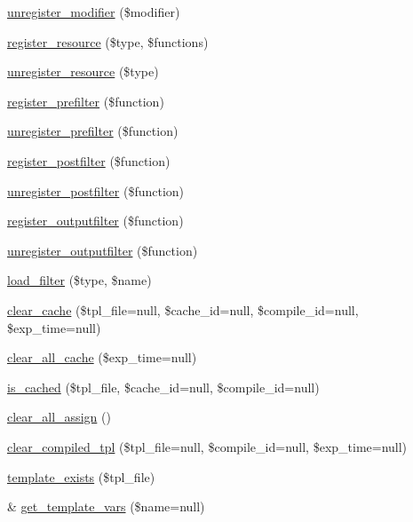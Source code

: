\begin{DoxyCompactItemize}
\hyperlink{class_smarty_aa0efdcad7fc5a36846e5e8bd8a455dd9}{unregister\-\_\-modifier} (\$modifier)
\item 
\hyperlink{class_smarty_a27683a72840c9401cde24eec57d493df}{register\-\_\-resource} (\$type, \$functions)
\item 
\hyperlink{class_smarty_a509d4408ce20f6def85118984b81a32e}{unregister\-\_\-resource} (\$type)
\item 
\hyperlink{class_smarty_afdd4dead058273890d629d207f236239}{register\-\_\-prefilter} (\$function)
\item 
\hyperlink{class_smarty_a8208fd226842f48de08ce37305295d64}{unregister\-\_\-prefilter} (\$function)
\item 
\hyperlink{class_smarty_a1eb31d2b852e5862a3d04284614d145b}{register\-\_\-postfilter} (\$function)
\item 
\hyperlink{class_smarty_a36d917f9b975efc48682198c705eb244}{unregister\-\_\-postfilter} (\$function)
\item 
\hyperlink{class_smarty_a54426aae9228293c47e05f4ceaacd516}{register\-\_\-outputfilter} (\$function)
\item 
\hyperlink{class_smarty_a8d7427d8dc5f3d71aeb3385b9aad3700}{unregister\-\_\-outputfilter} (\$function)
\item 
\hyperlink{class_smarty_ad642cca94486c492c56071fb32a3421c}{load\-\_\-filter} (\$type, \$name)
\item 
\hyperlink{class_smarty_a6b5412f074996dea92d89b32a13880d8}{clear\-\_\-cache} (\$tpl\-\_\-file=null, \$cache\-\_\-id=null, \$compile\-\_\-id=null, \$exp\-\_\-time=null)
\item 
\hyperlink{class_smarty_aaf1eab6e680746ae852abfc3814382fb}{clear\-\_\-all\-\_\-cache} (\$exp\-\_\-time=null)
\item 
\hyperlink{class_smarty_a70d12433755791c1383f394b6a41271d}{is\-\_\-cached} (\$tpl\-\_\-file, \$cache\-\_\-id=null, \$compile\-\_\-id=null)
\item 
\hyperlink{class_smarty_a47a576000a48c74fea66a209d7f0ac21}{clear\-\_\-all\-\_\-assign} ()
\item 
\hyperlink{class_smarty_a71153cdee03c4dcb864488b59442b162}{clear\-\_\-compiled\-\_\-tpl} (\$tpl\-\_\-file=null, \$compile\-\_\-id=null, \$exp\-\_\-time=null)
\item 
\hyperlink{class_smarty_abfade212562dbeff89ccf453c02f5a1b}{template\-\_\-exists} (\$tpl\-\_\-file)
\item 
\& \hyperlink{class_smarty_a0c15a4f13f37eaca8a6e8ed91ad77b23}{get\-\_\-template\-\_\-vars} (\$name=null)

\end{DoxyCompactItemize}
